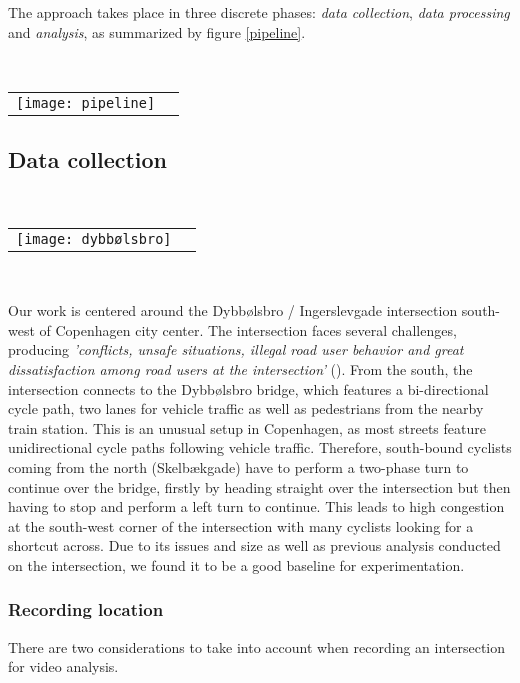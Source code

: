 The approach takes place in three discrete phases: \textit{data collection}, \textit{data processing} and \textit{analysis}, as summarized
by figure \ref{pipeline}.

\ \\ 
\raggedbottom
\begin{tabular}{@{}cc}
\texttt{[image: pipeline]} 
\end{tabular}
\label{pipeline}

\subsection{Data collection}
\ \\ 
\noindent
\begin{tabular}{@{}cc}
\texttt{[image: dybbølsbro]}
\end{tabular}
\label{intersection_overview}
\

Our work is centered around the Dybbølsbro / Ingerslevgade intersection south-west of Copenhagen
city center. The intersection faces several challenges, producing \textit{'conflicts, unsafe situations, illegal 
road user behavior and great dissatisfaction among road users at the intersection'} (\cite{CPHpost_2021}).
From the south, the intersection connects to the Dybbølsbro bridge, which features a bi-directional cycle path, two
lanes for vehicle traffic as well as pedestrians from the nearby train station. 
This is an unusual setup in Copenhagen, as most streets feature unidirectional cycle paths 
following vehicle traffic. Therefore, south-bound cyclists coming from the north (Skelbækgade) have to perform a two-phase 
turn to continue over the bridge, firstly by heading straight over the intersection but then having to stop and perform a left turn to 
continue. This leads to high congestion at the south-west corner of the intersection with many cyclists looking for a shortcut across. 
Due to its issues and size as well as previous analysis conducted on the intersection, we found it to be a good baseline for experimentation.

\subsubsection{Recording location}
There are two considerations to take into account when recording an intersection for video analysis.
\ \\

